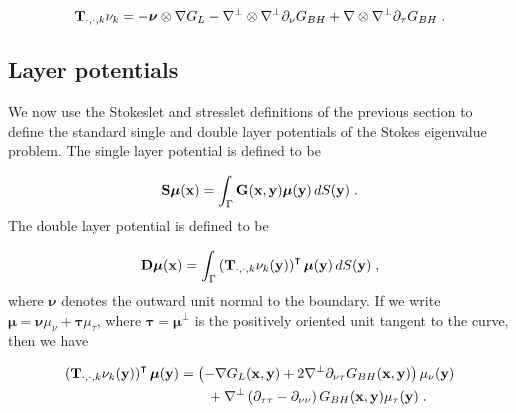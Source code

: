 \documentclass[preprint,12pt]{article}
\def\xx{{\bf x}}
\def\yy{{\bf y}}
\def\GG{{\bf G}}
\def\TT{{\bf T}}
\def\SS{{\bf S}}
\def\DD{{\bf D}}
\def\bmu{{\boldsymbol \mu}}
\def\bnu{{\boldsymbol \nu}}
\def\btau{{\boldsymbol \tau}}
\begin{document}
\begin{equation}
  \TT_{\cdot,\cdot,k} \nu_k = -\bnu \otimes \nabla G_L
  - \nabla^\bot \otimes \nabla^\bot \partial_\nu G_{BH}
  +\nabla \otimes \nabla^\bot \partial_\tau G_{BH} \; .
\end{equation}

\subsection{Layer potentials}

We now use the Stokeslet and stresslet definitions
of the previous section to define the standard single
and double layer potentials of the Stokes eigenvalue
problem. The single layer potential is defined to
be

\begin{equation}
  \SS \bmu (\xx) = \int_\Gamma \GG (\xx,\yy) \bmu(\yy)
  \, dS(\yy) \; .
\end{equation}
The double layer potential is defined to be

\begin{equation}
  \DD \bmu (\xx) = \int_\Gamma \left ( \TT_{\cdot,\cdot,k}\nu_k(\yy)
  \right )^\intercal \bmu(\yy) \, dS(\yy) \; ,
\end{equation}
where $\bnu$ denotes the outward unit normal to the boundary.
If we write $\bmu = \bnu \mu_\nu + \btau \mu_\tau$,
where $\btau = \bmu^\bot$ is the positively oriented unit
tangent to the curve, then we have

\begin{align}
  \left ( \TT_{\cdot,\cdot,k}\nu_k(\yy) \right )^\intercal
  \bmu(\yy) &= \left ( - \nabla G_L(\xx,\yy) + 2 \nabla^\bot
  \partial_{\nu\tau} G_{BH}(\xx,\yy) \right ) \mu_\nu(\yy) \nonumber \\
  & \qquad+
  \nabla^\bot \left (\partial_{\tau\tau}-\partial_{\nu\nu} \right )
  G_{BH}(\xx,\yy) \mu_\tau(\yy) \; .
\end{align}



\end{document}
